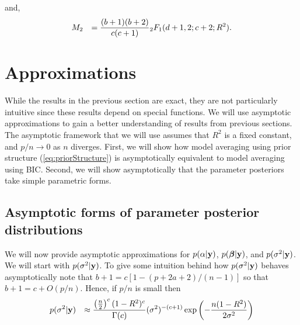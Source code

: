 \documentclass{article}[12pt]
\newcommand{\joc}[1]{{\color{red}#1}}
\begin{document}

\noindent 
and,
\begin{equation}\label{eq:M2}
\begin{array}{rl}
\displaystyle M_2
& \displaystyle =
\frac{(b+1)(b+2)}{c(c+1)}    {}_2 F_1(d+1, 2; c+ 2; R^2).    
\end{array} 
\end{equation}

 

\section{Approximations}
\label{sec:approximations}

While the results in the previous section are exact, they are not particularly intuitive since these results depend on special functions. We will use asymptotic approximations to gain a better understanding of results from previous sections.
The asymptotic framework that we will use assumes that $R^2$ is a
fixed constant, and $p/n \to 0$ as $n$ diverges.
First, we will show how model averaging using prior structure (\ref{eq:priorStructure}) 
is asymptotically equivalent to model averaging using BIC. Second, we will show 
asymptotically that the parameter posteriors take simple parametric forms.





\subsection{Asymptotic forms of parameter posterior distributions}

We will now provide asymptotic approximations for $p(\alpha|{\bf y})$,
$p({\boldsymbol \beta}|{\bf y})$, and $p(\sigma^2|{\bf y})$. We will start with $p(\sigma^2|{\bf y})$.
To give some intuition behind how $p(\sigma^2|{\bf y})$ behaves asymptotically 
note that $b + 1 = c \left[ 1 - (p + 2a + 2)/(n-1) \right]$ so that
$b + 1 = c + O(p/n)$. Hence, if $p/n$ is small then  
$$
\begin{array}{rl}
\displaystyle p(\sigma^2|{\bf y}) 
& \displaystyle 
\approx \frac{\left(\tfrac{n}{2}\right)^c (1 -  R^2)^{c}}{\Gamma(c)} (\sigma^2)^{-(c+1)} \exp\left(  - \frac{n(1 - R^2)}{2\sigma^2} \right)
\end{array}
$$
\end{document}
